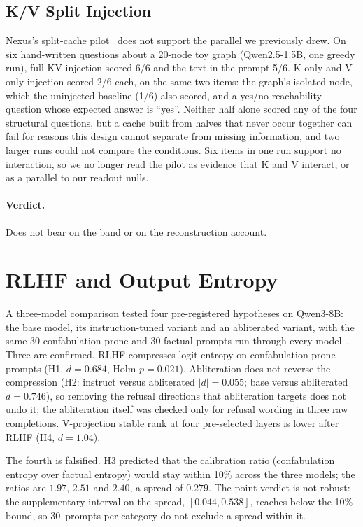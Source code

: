 \documentclass[11pt,a4paper]{article}
\begin{document}
\subsection{K/V Split Injection}
\label{sec:kvsplit}

Nexus's split-cache pilot~\citep{lyra2026nexus_kv} does not support the
parallel we previously drew. On six hand-written questions about a
20-node toy graph (Qwen2.5-1.5B, one greedy run), full KV injection
scored 6/6 and the text in the prompt 5/6. K-only and V-only injection
scored 2/6 each, on the same two items: the graph's isolated node,
which the uninjected baseline (1/6) also scored, and a yes/no
reachability question whose expected answer is ``yes''. Neither half
alone scored any of the four structural questions, but a cache built
from halves that never occur together can fail for reasons this design
cannot separate from missing information, and two larger runs could not
compare the conditions. Six items in one run support no interaction, so
we no longer read the pilot as evidence that K and V interact, or as a
parallel to our readout nulls.

\paragraph{Verdict.} Does not bear on the band or on the reconstruction
account.

\section{RLHF and Output Entropy}
\label{sec:rlhf}

A three-model comparison tested four pre-registered hypotheses on
Qwen3-8B: the base model, its instruction-tuned variant and an
abliterated variant, with the same 30 confabulation-prone and
30 factual prompts run through every model~\citep{lyra2026mine5}.
Three are confirmed. RLHF compresses
logit entropy on confabulation-prone prompts (H1, $d{=}0.684$, Holm
$p{=}0.021$). Abliteration does not reverse the compression (H2:
instruct versus abliterated $|d| = 0.055$; base versus abliterated
$d = 0.746$), so removing the refusal directions that abliteration
targets does not undo it; the abliteration itself was checked only for
refusal wording in three raw completions. V-projection stable rank
at four pre-selected layers is lower after RLHF (H4, $d = 1.04$).

The fourth is falsified. H3 predicted that the calibration ratio
(confabulation entropy over factual entropy) would stay within 10\%
across the three models; the ratios are $1.97$, $2.51$ and $2.40$, a
spread of $0.279$. The point verdict is not robust: the supplementary
interval on the spread, $[0.044, 0.538]$, reaches below the 10\% bound,
so 30~prompts per category do not exclude a spread within it.
\end{document}
